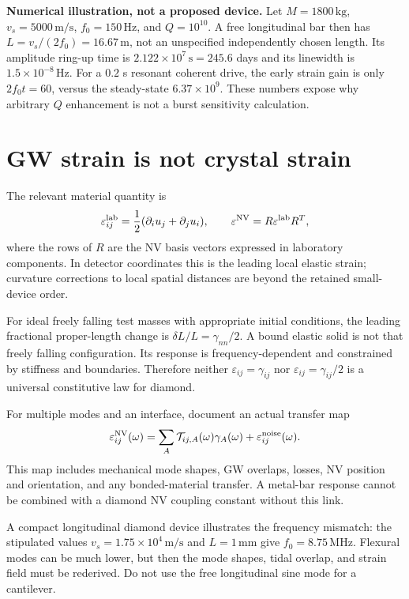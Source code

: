 \documentclass[a4paper,11pt]{article}
\newcommand{\eps}{\varepsilon}
\begin{document}
\textbf{Numerical illustration, not a proposed device.}
Let $M=1800\,\mathrm{kg}$, $v_s=5000\,\mathrm{m/s}$, $f_0=150\,\mathrm{Hz}$, and $Q=10^{10}$. A free longitudinal bar then has $L=v_s/(2f_0)=16.67\,\mathrm m$, not an unspecified independently chosen length. Its amplitude ring-up time is $2.122\times10^7\,\mathrm s=245.6$ days and its linewidth is $1.5\times10^{-8}\,\mathrm{Hz}$. For a $0.2$ s resonant coherent drive, the early strain gain is only $2f_0t=60$, versus the steady-state $6.37\times10^9$. These numbers expose why arbitrary $Q$ enhancement is not a burst sensitivity calculation.

\section{GW strain is not crystal strain}
\label{sec:strain}

The relevant material quantity is
\begin{equation}
 \eps^{\rm lab}_{ij}=\frac12(\partial_i u_j+\partial_j u_i),\qquad
 \eps^{\rm NV}=R\eps^{\rm lab}R^T,
 \label{eq:rotate}
\end{equation}
where the rows of $R$ are the NV basis vectors expressed in laboratory components. In detector coordinates this is the leading local elastic strain; curvature corrections to local spatial distances are beyond the retained small-device order.

For ideal freely falling test masses with appropriate initial conditions, the leading fractional proper-length change is $\delta L/L=\gamma_{nn}/2$. A bound elastic solid is not that freely falling configuration. Its response is frequency-dependent and constrained by stiffness and boundaries. Therefore neither $\eps_{ij}=\gamma_{ij}$ nor $\eps_{ij}=\gamma_{ij}/2$ is a universal constitutive law for diamond.

For multiple modes and an interface, document an actual transfer map
\begin{equation}
 \eps^{\rm NV}_{ij}(\omega)
 =\sum_A\mathcal T_{ij,A}(\omega)\gamma_A(\omega)
 +\eps^{\rm noise}_{ij}(\omega).
\end{equation}
This map includes mechanical mode shapes, GW overlaps, losses, NV position and orientation, and any bonded-material transfer. A metal-bar response cannot be combined with a diamond NV coupling constant without this link.

A compact longitudinal diamond device illustrates the frequency mismatch: the stipulated values $v_s=1.75\times10^4\,\mathrm{m/s}$ and $L=1\,\mathrm{mm}$ give $f_0=8.75\,\mathrm{MHz}$. Flexural modes can be much lower, but then the mode shapes, tidal overlap, and strain field must be rederived. Do not use the free longitudinal sine mode for a cantilever.
\end{document}
